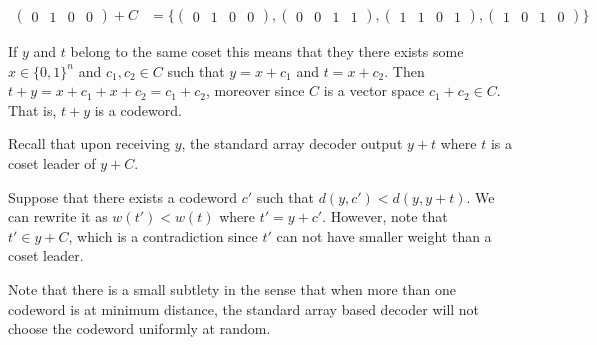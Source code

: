 \begin{solution}
\begin{align}
\begin{pmatrix}0&1&0&0\end{pmatrix}+C&=\{\begin{pmatrix}0&1&0&0\end{pmatrix},\begin{pmatrix}0&0&1&1\end{pmatrix},\begin{pmatrix}1&1&0&1\end{pmatrix},\begin{pmatrix}1&0&1&0\end{pmatrix}\}
\end{align}
\end{solution}
\begin{solution}
If $y$ and $t$ belong to the same coset this means that they there exists some $x\in\{0,1\}^n$ and $c_1,c_2\in C$ such that $y=x+c_1$ and $t=x+c_2$. Then $t+y=x+c_1+x+c_2=c_1+c_2$, moreover since $C$ is a vector space $c_1+c_2\in C$. That is, $t+y$ is a codeword. 
\end{solution}
\begin{solution}
Recall that upon receiving $y$, the standard array decoder output $y+t$ where $t$ is a coset leader of $y+C$.

Suppose that there exists a codeword $c'$ such that $d(y,c')<d(y,y+t)$. We can rewrite it as $w(t')<w(t)$ where $t'=y+c'$. However, note that $t'\in y+C$, which is a contradiction since $t'$ can not have smaller weight than a coset leader. 

Note that there is a small subtlety in the sense that when more than one codeword is at minimum distance, the standard array based decoder will not choose the codeword uniformly at random.
\end{solution}
